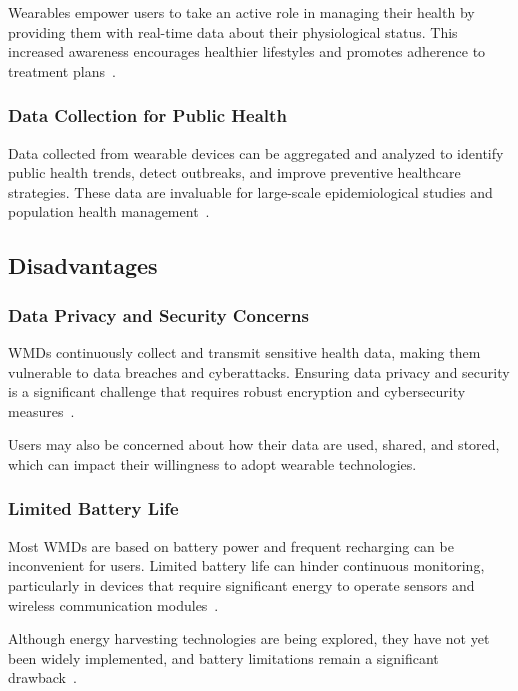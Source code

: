 \documentclass[journal]{IEEEtran}
\begin{document}
        Wearables empower users to take an active role in managing their health by providing them with real-time data about their physiological status. This increased awareness encourages healthier lifestyles and promotes adherence to treatment plans~\cite{Iqbal2016}.

        \subsubsection{Data Collection for Public Health}

        Data collected from wearable devices can be aggregated and analyzed to identify public health trends, detect outbreaks, and improve preventive healthcare strategies. These data are invaluable for large-scale epidemiological studies and population health management~\cite{Cusack2024}.

    \subsection{Disadvantages}

        \subsubsection{Data Privacy and Security Concerns}

        WMDs continuously collect and transmit sensitive health data, making them vulnerable to data breaches and cyberattacks. Ensuring data privacy and security is a significant challenge that requires robust encryption and cybersecurity measures~\cite{Iqbal2016}.

        Users may also be concerned about how their data are used, shared, and stored, which can impact their willingness to adopt wearable technologies.

        \subsubsection{Limited Battery Life}

        Most WMDs are based on battery power and frequent recharging can be inconvenient for users. Limited battery life can hinder continuous monitoring, particularly in devices that require significant energy to operate sensors and wireless communication modules~\cite{Ates2022}.

        Although energy harvesting technologies are being explored, they have not yet been widely implemented, and battery limitations remain a significant drawback~\cite{Gao2024}.
\end{document}
